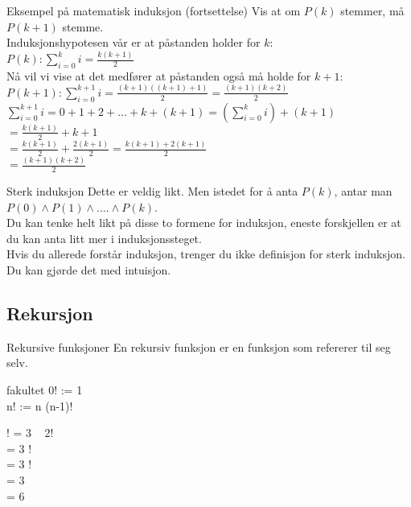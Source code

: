 \begin{frame}{Eksempel på matematisk induksjon (fortsettelse)}
    Vis at om $P(k)$ stemmer, må $P(k+1)$ stemme.\\[2mm]
    Induksjonshypotesen vår er at påstanden holder for $k$: \\
    $P(k): \sum_{i=0}^{k} i = \frac{k(k+1)}{2}$\\[2mm]

    Nå vil vi vise at det medfører at påstanden også må holde for $k+1$:\\
    $P(k+1): \sum_{i=0}^{k+1} i = \frac{(k+1)((k+1)+1)}{2} = \frac{(k+1)(k+2)}{2}$\\

    $\sum_{i=0}^{k+1} i = 0 + 1 + 2 + ... + k + (k+1) = (\sum_{i=0}^{k} i )+ (k+1)$\\
\pause
    $=\frac{k(k+1)}{2} + k + 1$\\
    $= \frac{k(k+1)}{2}+\frac{2(k+1)}{2} = \frac{k(k+1)+2(k+1)}{2}$\\
    $= \frac{(k+1)(k+2)}{2}$ \checkmark
\end{frame}

\begin{frame}{Sterk induksjon}
    Dette er veldig likt. Men istedet for å anta $P(k)$, antar man $P(0) \land P(1) \land .... \land P(k)$.\\
    Du kan tenke helt likt på disse to formene for induksjon, eneste forskjellen er at du kan anta litt mer i induksjonssteget.\\

    Hvis du allerede forstår induksjon, trenger du ikke definisjon for sterk induksjon. Du kan gjørde det med intuisjon.
\end{frame}

\subsection{Rekursjon}
\begin{frame}{Rekursive funksjoner}
    En rekursiv funksjon er en funksjon som refererer til seg selv.
    \pause
    \begin{block}{fakultet}
        0! := 1 \\
        n! := n \cdot (n-1)!\\
    \end{block}    
    ! = 3 \cdot ~ 2!\\
     = 3  !\\
     = 3   !\\
     = 3   \\
     = 6
\end{frame}

